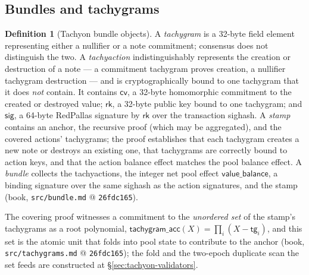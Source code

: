 \documentclass[11pt,a4paper]{article}
\theoremstyle{definition}
\newtheorem{definition}[theorem]{Definition}
\newcommand{\cvsym}{\mathsf{cv}}
\newcommand{\rk}{\mathsf{rk}}
\begin{document}
\subsection{Bundles and tachygrams}\label{sec:tachyon-design-bundle}

\begin{definition}[Tachyon bundle objects]\label{def:tachyon-design-bundle}
A \emph{tachygram} is a 32-byte field element representing either a
nullifier or a note commitment; consensus does not distinguish the two. A
\emph{tachyaction} indistinguishably represents the creation or
destruction of a note --- a commitment tachygram proves creation, a
nullifier tachygram destruction --- and is cryptographically bound to
one tachygram that it does \emph{not} contain. It contains
$\cvsym$, a 32-byte homomorphic commitment to the created or destroyed
value; $\rk$, a 32-byte public key bound to one tachygram; and
$\mathsf{sig}$, a 64-byte RedPallas signature by $\rk$ over the
transaction sighash. A \emph{stamp} contains an anchor, the recursive
proof (which may be aggregated), and the covered actions' tachygrams; the
proof establishes that each tachygram creates a new note or destroys an
existing one, that tachygrams are correctly bound to action keys, and that
the action balance effect matches the pool balance effect. A \emph{bundle}
collects the tachyactions, the integer net pool effect
$\mathsf{value\_balance}$, a binding signature over the same sighash as
the action signatures, and the stamp (book, \texttt{src/bundle.md} @
\texttt{26fdc165}).
\end{definition}

The covering proof witnesses a commitment to the \emph{unordered set} of
the stamp's tachygrams as a root polynomial,
$\mathsf{tachygram\_acc}(X) = \prod_i (X - \mathsf{tg}_i)$, and this set is
the atomic unit that folds into pool state to contribute to the anchor
(book, \texttt{src/tachygrams.md} @ \texttt{26fdc165}); the fold and the
two-epoch duplicate scan the set feeds are constructed at
\S\ref{sec:tachyon-validators}.
\end{document}
